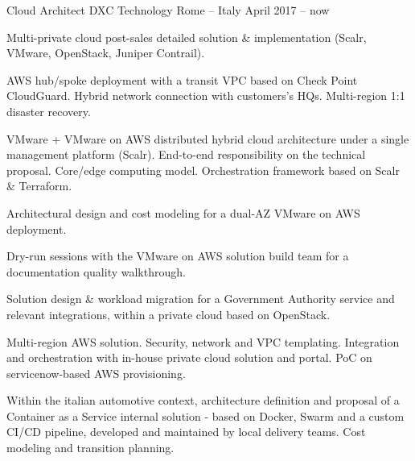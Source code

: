 
\begin{cventries}

  \cventry
    {Cloud Architect} %
    {DXC Technology} %
    {Rome -- Italy} %
    {April 2017 -- now} %
    {
      \begin{cvitems} %
        \item {Multi-private cloud post-sales detailed solution \& implementation (Scalr, VMware, OpenStack, Juniper Contrail).}
        \item {AWS hub/spoke deployment with a transit VPC based on Check Point CloudGuard. Hybrid network connection with customers's HQs. Multi-region 1:1 disaster recovery.}
        \item {VMware + VMware on AWS distributed hybrid cloud architecture under a single management platform (Scalr). End-to-end responsibility on the technical proposal. Core/edge computing model. Orchestration framework based on Scalr \& Terraform.}
        \item {Architectural design and cost modeling for a dual-AZ VMware on AWS deployment.}
        \item {Dry-run sessions with the VMware on AWS solution build team for a documentation quality walkthrough.}
        \item {Solution design \& workload migration for a Government Authority service and relevant integrations, within a private cloud based on OpenStack.}
        \item {Multi-region AWS solution. Security, network and VPC templating. Integration and orchestration with in-house private cloud solution and portal. PoC on servicenow-based AWS provisioning.}
        \item {Within the italian automotive context, architecture definition and proposal of a Container as a Service internal solution - based on Docker, Swarm and a custom CI/CD pipeline, developed and maintained by local delivery teams. Cost modeling and transition planning.}
      \end{cvitems}
    }



\end{cventries}
